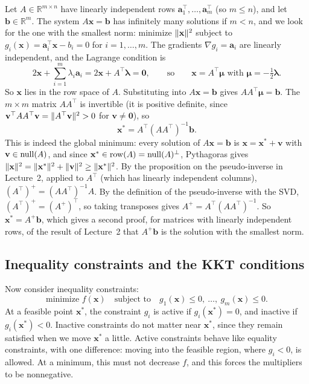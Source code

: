 \begin{example}\label{L3-ex:min-norm}
    Let $A \in \mathbb{R}^{m \times n}$ have linearly independent rows $\mathbf{a}_1^\top, \ldots, \mathbf{a}_m^\top$ (so $m \leq n$), and let $\mathbf{b} \in \mathbb{R}^m$. The system $A\mathbf{x} = \mathbf{b}$ has infinitely many solutions if $m < n$, and we look for the one with the smallest norm: minimize $\lVert \mathbf{x} \rVert^2$ subject to $g_i(\mathbf{x}) = \mathbf{a}_i^\top\mathbf{x} - b_i = 0$ for $i = 1, \ldots, m$. The gradients $\nabla g_i = \mathbf{a}_i$ are linearly independent, and the Lagrange condition is
    \[2\mathbf{x} + \sum_{i=1}^m \lambda_i\mathbf{a}_i = 2\mathbf{x} + A^\top\boldsymbol{\lambda} = \mathbf{0}, \qquad \text{so} \qquad \mathbf{x} = A^\top\boldsymbol{\mu} \text{ with } \boldsymbol{\mu} = -\tfrac{1}{2}\boldsymbol{\lambda}.\]
    So $\mathbf{x}$ lies in the row space of $A$. Substituting into $A\mathbf{x} = \mathbf{b}$ gives $AA^\top\boldsymbol{\mu} = \mathbf{b}$. The $m \times m$ matrix $AA^\top$ is invertible (it is positive definite, since $\mathbf{v}^\top AA^\top\mathbf{v} = \lVert A^\top\mathbf{v} \rVert^2 > 0$ for $\mathbf{v} \neq \mathbf{0}$), so
    \[\mathbf{x}^* = A^\top(AA^\top)^{-1}\mathbf{b}.\]
    This is indeed the global minimum: every solution of $A\mathbf{x} = \mathbf{b}$ is $\mathbf{x} = \mathbf{x}^* + \mathbf{v}$ with $\mathbf{v} \in \operatorname{null}(A)$, and since $\mathbf{x}^* \in \operatorname{row}(A) = \operatorname{null}(A)^\perp$, Pythagoras gives $\lVert \mathbf{x} \rVert^2 = \lVert \mathbf{x}^* \rVert^2 + \lVert \mathbf{v} \rVert^2 \geq \lVert \mathbf{x}^* \rVert^2$. By the proposition on the pseudo-inverse in Lecture~2, applied to $A^\top$ (which has linearly independent columns), $(A^\top)^+ = (AA^\top)^{-1}A$. By the definition of the pseudo-inverse with the SVD, $(A^\top)^+ = (A^+)^\top$, so taking transposes gives $A^+ = A^\top(AA^\top)^{-1}$. So $\mathbf{x}^* = A^+\mathbf{b}$, which gives a second proof, for matrices with linearly independent rows, of the result of Lecture~2 that $A^+\mathbf{b}$ is the solution with the smallest norm.
\end{example}

\subsection{Inequality constraints and the KKT conditions}

Now consider inequality constraints:
\[\text{minimize } f(\mathbf{x}) \quad \text{subject to} \quad g_1(\mathbf{x}) \leq 0, \ \ldots, \ g_m(\mathbf{x}) \leq 0.\]
At a feasible point $\mathbf{x}^*$, the constraint $g_i$ is active if $g_i(\mathbf{x}^*) = 0$, and inactive if $g_i(\mathbf{x}^*) < 0$. Inactive constraints do not matter near $\mathbf{x}^*$, since they remain satisfied when we move $\mathbf{x}^*$ a little. Active constraints behave like equality constraints, with one difference: moving into the feasible region, where $g_i < 0$, is allowed. At a minimum, this must not decrease $f$, and this forces the multipliers to be nonnegative.

